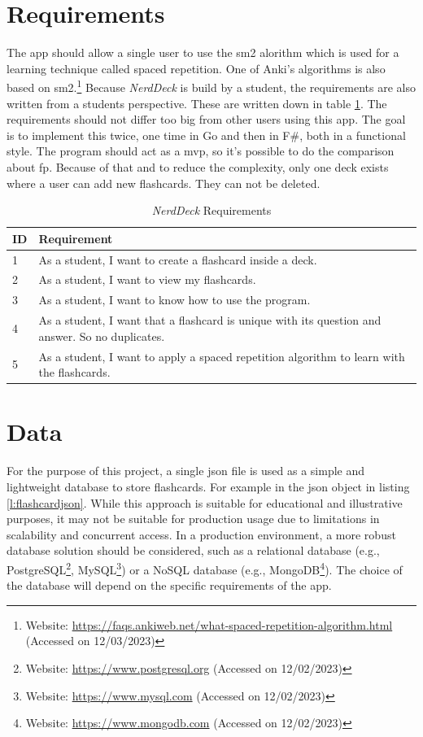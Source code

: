     \section{Requirements}
     The \ac{app} should allow a single user to use the \ac{sm2} alorithm which is used for a learning technique called spaced repetition.\cite{Sm2} One of Anki's algorithms is also based on \ac{sm2}.\footnote{Website: \url{https://faqs.ankiweb.net/what-spaced-repetition-algorithm.html} (Accessed on 12/03/2023)} Because \textit{NerdDeck} is build by a student, the requirements are also written from a students perspective. These are written down in table \ref{tab:requirements}. The requirements should not differ too big from other users using this \ac{app}. The goal is to implement this twice, one time in Go and then in F\#, both in a functional style. The program should act as a \ac{mvp}, so it's possible to do the comparison about \ac{fp}. Because of that and to reduce the complexity, only one deck exists where a user can add new flashcards. They can not be deleted.
    \begin{table}[h]
        \centering
        \begin{tabular}{|m{0.5in}|m{4in}|}
            \hline
            \textbf{ID} & \textbf{Requirement} \\
            \hline
            1 & As a student, I want to create a flashcard inside a deck. \\
            \hline
            2 & As a student, I want to view my flashcards. \\
            \hline
            3 & As a student, I want to know how to use the program. \\
            \hline
            4 & As a student, I want that a flashcard is unique with its question and answer. So no duplicates.  \\
            \hline
            5 & As a student, I want to apply a spaced repetition algorithm to learn with the flashcards. \\
            \hline
        \end{tabular}
        \caption{\textit{NerdDeck} Requirements}\label{tab:requirements}
    \end{table}

    \section{Data}
    For the purpose of this project, a single \ac{json} file is used as a simple and lightweight database to store flashcards. For example in the \ac{json} object in listing \ref{l:flashcardjson}. While this approach is suitable for educational and illustrative purposes, it may not be suitable for production usage due to limitations in scalability and concurrent access. In a production environment, a more robust database solution should be considered, such as a relational database (e.g., PostgreSQL\footnote{Website: \url{https://www.postgresql.org} (Accessed on 12/02/2023)}, MySQL\footnote{Website: \url{https://www.mysql.com} (Accessed on 12/02/2023)}) or a NoSQL database (e.g., MongoDB\footnote{Website: \url{https://www.mongodb.com} (Accessed on 12/02/2023)}). The choice of the database will depend on the specific requirements of the \ac{app}.


